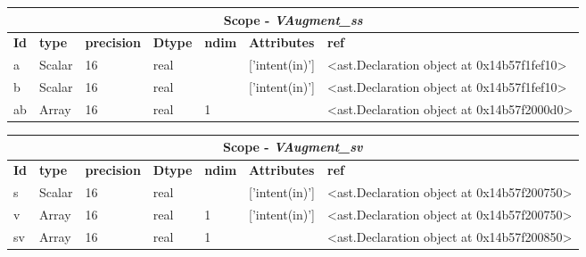 \documentclass{report}
\begin{document}
\begin{center}
\begin{longtable}{|p{3.5cm}|p{1.5cm}|p{1.5cm}|p{1.5cm}|p{1cm}|p{2cm}|p{4cm}| }
\hline
\multicolumn{7}{|c|}{\textbf{Scope} -  \textbf{\textit{VAugment\_ss}}} \\ 
\hline
\textbf{Id} & \textbf{type} & \textbf{precision} & \textbf{Dtype} & \textbf{ndim} & \textbf{Attributes} & \textbf{ref} \\\hline

a & Scalar & 16 & real &  & ['intent(in)'] & <ast.Declaration object at 0x14b57f1fef10> \\\hline

b & Scalar & 16 & real &  & ['intent(in)'] & <ast.Declaration object at 0x14b57f1fef10> \\\hline

ab & Array & 16 & real & 1 &  & <ast.Declaration object at 0x14b57f2000d0> \\\hline

\end{longtable}
\end{center}

 \vspace{1cm}

\begin{center}
\begin{longtable}{|p{3.5cm}|p{1.5cm}|p{1.5cm}|p{1.5cm}|p{1cm}|p{2cm}|p{4cm}| }
\hline
\multicolumn{7}{|c|}{\textbf{Scope} -  \textbf{\textit{VAugment\_sv}}} \\ 
\hline
\textbf{Id} & \textbf{type} & \textbf{precision} & \textbf{Dtype} & \textbf{ndim} & \textbf{Attributes} & \textbf{ref} \\\hline

s & Scalar & 16 & real &  & ['intent(in)'] & <ast.Declaration object at 0x14b57f200750> \\\hline

v & Array & 16 & real & 1 & ['intent(in)'] & <ast.Declaration object at 0x14b57f200750> \\\hline

sv & Array & 16 & real & 1 &  & <ast.Declaration object at 0x14b57f200850> \\\hline

\end{longtable}
\end{center}

 \vspace{1cm}
\end{document}
